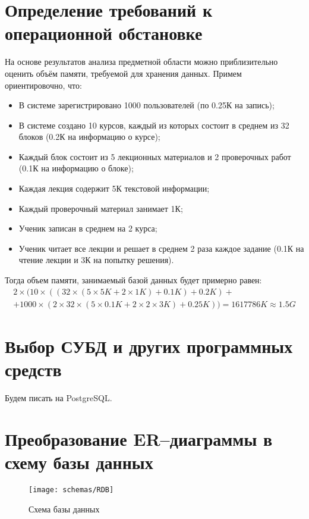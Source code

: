 \documentclass[a4paper,14pt]{article}
\begin{document}
\section{Определение требований к операционной обстановке}
На основе результатов анализа предметной области можно приблизительно оценить объём памяти, требуемой для хранения данных.
Примем ориентировочно, что:
\begin{itemize}
	\item В системе зарегистрировано 1000 пользователей (по 0.25К на запись);
	\item В системе создано 10 курсов, каждый из которых состоит в среднем из 32 блоков (0.2К на информацию о курсе);
	\item Каждый блок состоит из 5 лекционных материалов и 2 проверочных работ (0.1К на информацию о блоке);
	\item Каждая лекция содержит 5К текстовой информации;
	\item Каждый проверочный материал занимает 1К;
	\item Ученик записан в среднем на 2 курса;
	\item Ученик читает все лекции и решает в среднем 2 раза каждое задание (0.1К на чтение лекции и 3К на попытку решения).
\end{itemize}

Тогда объем памяти, занимаемый базой данных будет примерно равен:
\begin{multline*}
2 \times( 10 \times ((32 \times (5 \times 5K + 2 \times 1K) + 0.1K) + 0.2K) + \\ 
+ 1000 \times (2 \times 32 \times (5 \times 0.1K + 2 \times 2 \times 3K) + 0.25K)) = 1617786K	\approx 1.5G
\end{multline*}

\section{Выбор СУБД и других программных средств}
Будем писать на PostgreSQL.

\section{Преобразование ER–диаграммы в схему базы данных}

\begin{figure}[H]
	\centering		
	\texttt{[image: schemas/RDB]}
	\caption{Схема базы данных}\label{img:RDB}
\end{figure}
\end{document}
